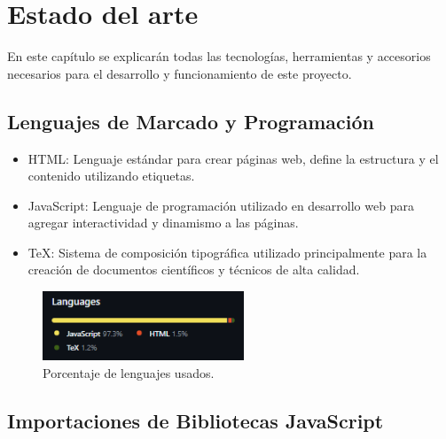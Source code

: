 \documentclass[a4paper, 12pt]{book}
\begin{document}
\cleardoublepage
\chapter{Estado del arte}
\label{chap:estado}

En este capítulo se explicarán todas las tecnologías, herramientas y accesorios necesarios para el desarrollo y funcionamiento de este proyecto.


\section{Lenguajes de Marcado y Programación} 
\label{sec:lenguajes}

\begin{itemize}
  \item HTML: Lenguaje estándar para crear páginas web, define la estructura y el contenido utilizando etiquetas.
  
  \item JavaScript: Lenguaje de programación utilizado en desarrollo web para agregar interactividad y dinamismo a las páginas.
  
  \item TeX: Sistema de composición tipográfica utilizado principalmente para la creación de documentos científicos y técnicos de alta calidad.
  
\end{itemize}

\begin{figure}
  \centering
  \includegraphics[width=6cm, keepaspectratio]{img/lenguajes.png}
  \caption{Porcentaje de lenguajes usados.}
  \label{fig:lenguajes}
\end{figure}


\section{Importaciones de Bibliotecas JavaScript} 
\label{sec:importaciones}
\end{document}
